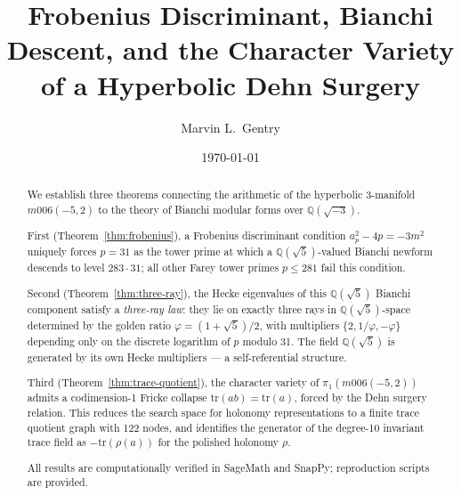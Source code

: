 \documentclass{amsart}
\title{Frobenius Discriminant, Bianchi Descent, and the Character Variety
       of a Hyperbolic Dehn Surgery}
\author{Marvin L.\ Gentry}
\date{\today}
\theoremstyle{definition}
\theoremstyle{remark}
\begin{document}
\begin{abstract}
We establish three theorems connecting the arithmetic of the hyperbolic
3-manifold $m006(-5,2)$ to the theory of Bianchi modular forms over
$\mathbb{Q}(\sqrt{-3})$.

First (Theorem~\ref{thm:frobenius}), a Frobenius discriminant condition
$a_p^2 - 4p = -3m^2$ uniquely forces $p = 31$ as the tower prime at
which a $\mathbb{Q}(\sqrt{5})$-valued Bianchi newform descends to level
$283 \cdot 31$; all other Farey tower primes $p \leq 281$ fail this condition.

Second (Theorem~\ref{thm:three-ray}), the Hecke eigenvalues of this
$\mathbb{Q}(\sqrt{5})$ Bianchi component satisfy a \emph{three-ray law}:
they lie on exactly three rays in $\mathbb{Q}(\sqrt{5})$-space determined
by the golden ratio $\varphi = (1+\sqrt{5})/2$, with multipliers
$\{2, 1/\varphi, -\varphi\}$ depending only on the discrete logarithm
of $p$ modulo 31. The field $\mathbb{Q}(\sqrt{5})$ is generated by its
own Hecke multipliers — a self-referential structure.

Third (Theorem~\ref{thm:trace-quotient}), the character variety of
$\pi_1(m006(-5,2))$ admits a codimension-1 Fricke collapse
$\mathrm{tr}(ab) = \mathrm{tr}(a)$, forced by the Dehn surgery relation.
This reduces the search space for holonomy representations to a finite
trace quotient graph with 122 nodes, and identifies the generator of the
degree-10 invariant trace field as $-\mathrm{tr}(\rho(a))$ for the
polished holonomy $\rho$.

All results are computationally verified in SageMath and SnapPy;
reproduction scripts are provided.
\end{abstract}

\maketitle
\tableofcontents










\end{document}
